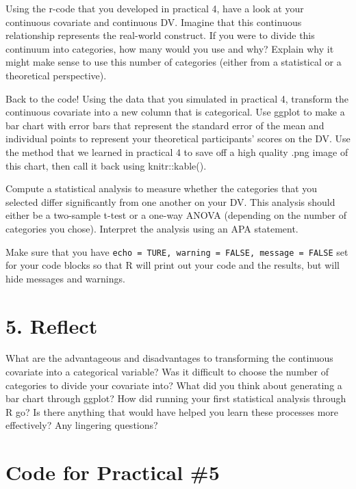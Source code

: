 \documentclass[
]{book}
\begin{document}
Using the r-code that you developed in practical 4, have a look at your continuous covariate and continuous DV. Imagine that this continuous relationship represents the real-world construct. If you were to divide this continuum into categories, how many would you use and why? Explain why it might make sense to use this number of categories (either from a statistical or a theoretical perspective).

Back to the code! Using the data that you simulated in practical 4, transform the continuous covariate into a new column that is categorical. Use ggplot to make a bar chart with error bars that represent the standard error of the mean and individual points to represent your theoretical participants' scores on the DV. Use the method that we learned in practical 4 to save off a high quality .png image of this chart, then call it back using knitr::kable().

Compute a statistical analysis to measure whether the categories that you selected differ significantly from one another on your DV. This analysis should either be a two-sample t-test or a one-way ANOVA (depending on the number of categories you chose). Interpret the analysis using an APA statement.

Make sure that you have \texttt{echo\ =\ TURE,\ warning\ =\ FALSE,\ message\ =\ FALSE} set for your code blocks so that R will print out your code and the results, but will hide messages and warnings.

\section*{5. Reflect}\label{reflect-4}

What are the advantageous and disadvantages to transforming the continuous covariate into a categorical variable? Was it difficult to choose the number of categories to divide your covariate into? What did you think about generating a bar chart through ggplot? How did running your first statistical analysis through R go? Is there anything that would have helped you learn these processes more effectively? Any lingering questions?

\section*{Code for Practical \#5}\label{code-for-practical-5}
\end{document}

